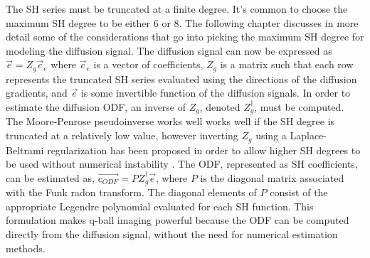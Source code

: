 The SH series must be truncated at a finite degree. It's common to choose the maximum SH degree to be either 6 or 8. The following chapter discusses in more detail some of the considerations that go into picking the maximum SH degree for modeling the diffusion signal. The diffusion signal can now be expressed as $\vec{e} = Z_g\vec{c}_{e}$ where $\vec{c}_{e}$ is a vector of coefficients, $Z_g$ is a matrix such that each row represents the truncated SH series evaluated using the directions of the diffusion gradients, and $\vec{e}$ is some invertible function of the diffusion signals\cite{Hess_2006}. In order to estimate the diffusion ODF, an inverse of $Z_g$, denoted $Z_g^{\dagger}$, must be computed. The Moore-Penrose pseudoinverse works well works well if the SH degree is truncated at a relatively low value, however inverting $Z_g$ using a Laplace-Beltrami regularization has been proposed in order to allow higher SH degrees to be used without numerical instability \cite{Descoteaux_2007}. The ODF, represented as SH coefficients, can be estimated as, $\vec{c_{ODF}} = PZ_g^{\dagger}\vec{e}$, where $P$ is the diagonal matrix associated with the Funk radon transform. The diagonal elements of $P$ consist of the appropriate Legendre polynomial evaluated for each SH function. This formulation makes q-ball imaging powerful because the ODF can be computed directly from the diffusion signal, without the need for numerical estimation methods.


